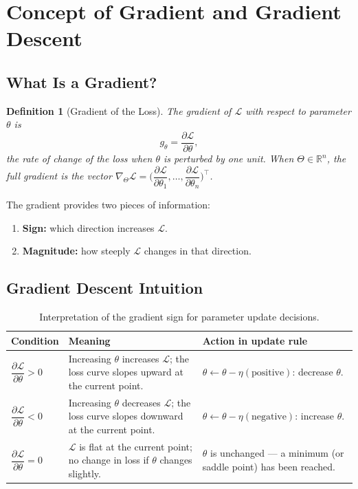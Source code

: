 \documentclass[12pt,a4paper]{article}
\newtheorem{definition}{Definition}[section]
\newcommand{\Loss}{\mathcal{L}}
\newcommand{\pderiv}[2]{\dfrac{\partial #1}{\partial #2}}
\begin{document}
\section{Concept of Gradient and Gradient Descent}
\label{sec:gradient}

\subsection{What Is a Gradient?}

\begin{definition}[Gradient of the Loss]
\label{def:gradient}
The \emph{gradient} of $\Loss$ with respect to parameter $\theta$ is
\begin{equation}
  g_\theta = \pderiv{\Loss}{\theta},
  \label{eq:gradient-def}
\end{equation}
the rate of change of the loss when $\theta$ is perturbed by one unit.
When $\Theta \in \mathbb{R}^n$, the full gradient is the vector
$\nabla_\Theta \Loss = \bigl(\pderiv{\Loss}{\theta_1}, \ldots, \pderiv{\Loss}{\theta_n}\bigr)^\top$.
\end{definition}

The gradient provides two pieces of information:
\begin{enumerate}[leftmargin=2em]
  \item \textbf{Sign:} which direction increases $\Loss$.
  \item \textbf{Magnitude:} how steeply $\Loss$ changes in that direction.
\end{enumerate}

\subsection{Gradient Descent Intuition}

\begin{table}[ht]
\centering
\caption{Interpretation of the gradient sign for parameter update decisions.}
\label{tab:gradient-sign}
\begin{tabular}{p{3.5cm}p{5.5cm}p{4cm}}
\toprule
\textbf{Condition} & \textbf{Meaning} & \textbf{Action in update rule} \\
\midrule
$\pderiv{\Loss}{\theta} > 0$ &
  Increasing $\theta$ increases $\Loss$; the loss curve slopes upward at the
  current point. &
  $\theta \leftarrow \theta - \eta(\text{positive})$: decrease $\theta$. \\[6pt]
$\pderiv{\Loss}{\theta} < 0$ &
  Increasing $\theta$ decreases $\Loss$; the loss curve slopes downward at
  the current point. &
  $\theta \leftarrow \theta - \eta(\text{negative})$: increase $\theta$. \\[6pt]
$\pderiv{\Loss}{\theta} = 0$ &
  $\Loss$ is flat at the current point; no change in loss if $\theta$
  changes slightly. &
  $\theta$ is unchanged --- a minimum (or saddle point) has been reached. \\
\bottomrule
\end{tabular}
\end{table}
\end{document}
